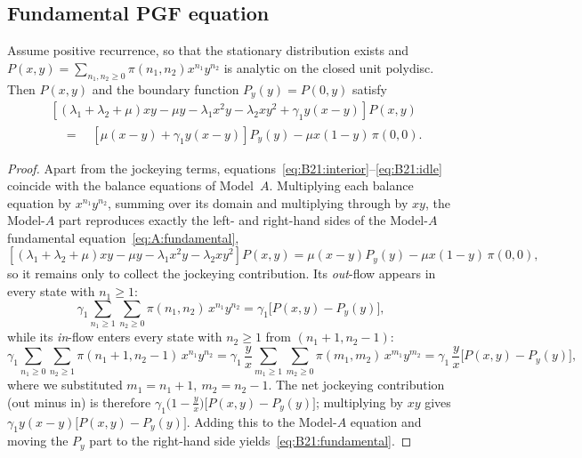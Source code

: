 \subsection{Fundamental PGF equation}

\begin{lemma}\label{lem:B21:fundamental}
Assume positive recurrence, so that the stationary distribution exists and
$P(x,y)=\sum_{n_1,n_2\ge0}\pi(n_1,n_2)x^{n_1}y^{n_2}$ is analytic on the closed unit
polydisc. Then $P(x,y)$ and the boundary function $P_y(y)=P(0,y)$ satisfy
\begin{equation}
    \begin{split}
        &\left[(\lambda_1+\lambda_2+\mu)xy - \mu y - \lambda_1 x^2y - \lambda_2 xy^2
               + \gamma_1 y(x-y)\right]P(x,y) \\
        &\quad=\quad \left[\mu(x-y) + \gamma_1 y(x-y)\right]P_y(y)
               - \mu x(1-y)\,\pi(0,0).
    \end{split}
    \label{eq:B21:fundamental}
\end{equation}
\end{lemma}

\begin{proof}
Apart from the jockeying terms, equations~\eqref{eq:B21:interior}--\eqref{eq:B21:idle}
coincide with the balance equations of Model~$A$. Multiplying each balance equation by
$x^{n_1}y^{n_2}$, summing over its domain and multiplying through by $xy$, the
Model-$A$ part reproduces exactly the left- and right-hand sides of the Model-$A$
fundamental equation~\eqref{eq:A:fundamental},
\begin{equation*}
    \left[ (\lambda_1+\lambda_2+\mu)xy - \mu y - \lambda_1 x^2y - \lambda_2 xy^2 \right] P(x,y)
    = \mu(x-y) P_y(y) - \mu x(1-y)\,\pi(0,0),
\end{equation*}
so it remains only to collect the jockeying contribution. Its \emph{out}-flow appears in
every state with $n_1\ge1$:
\begin{equation*}
    \gamma_1\sum_{n_1\ge1}\sum_{n_2\ge0}\pi(n_1,n_2)\,x^{n_1}y^{n_2}
    = \gamma_1\bigl[P(x,y)-P_y(y)\bigr],
\end{equation*}
while its \emph{in}-flow enters every state with $n_2\ge1$ from $(n_1+1,n_2-1)$:
\begin{equation*}
    \gamma_1\sum_{n_1\ge0}\sum_{n_2\ge1}\pi(n_1+1,n_2-1)\,x^{n_1}y^{n_2}
    = \gamma_1\,\frac{y}{x}\sum_{m_1\ge1}\sum_{m_2\ge0}\pi(m_1,m_2)\,x^{m_1}y^{m_2}
    = \gamma_1\,\frac{y}{x}\bigl[P(x,y)-P_y(y)\bigr],
\end{equation*}
where we substituted $m_1=n_1+1,\ m_2=n_2-1$. The net jockeying contribution (out minus
in) is therefore $\gamma_1\bigl(1-\tfrac{y}{x}\bigr)\bigl[P(x,y)-P_y(y)\bigr]$; multiplying
by $xy$ gives $\gamma_1 y(x-y)\bigl[P(x,y)-P_y(y)\bigr]$. Adding this to the Model-$A$
equation and moving the $P_y$ part to the right-hand side yields~\eqref{eq:B21:fundamental}.
\end{proof}

